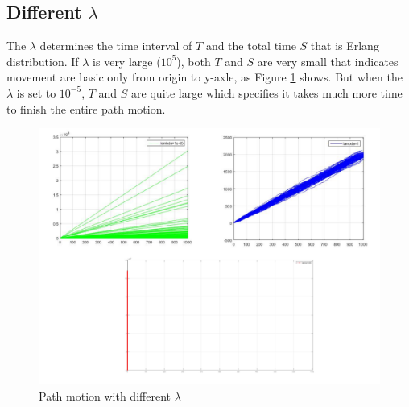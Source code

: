 \subsection{Different $\lambda$}
The $\lambda$ determines the time interval of $T$ and the total time $S$ that is Erlang distribution. If $\lambda$ is very large ($10^{5}$), both $T$ and $S$ are very small that indicates movement are basic only from origin to y-axle, as Figure \ref{fig:difflambda} shows. But when the $\lambda$ is set to $10^{-5}$, $T$ and $S$ are quite large which specifies it takes much more time to finish the entire path motion.
\begin{figure}[H]
    \centering
    \includegraphics[scale=0.65]{figures/Task3/Diff_lambda.pdf}
    \caption{Path motion with different $\lambda$  }
    \label{fig:difflambda}
\end{figure}


